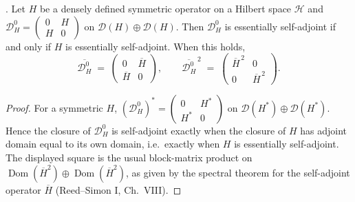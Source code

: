 \begin{lemma}
\label{v4-arith:w9-r4:lem:dirac-double-detects-sa}
\ClaimStatusProvedHere. Let \(H\) be a densely defined symmetric
operator on a Hilbert space \(\mathcal{H}\) and
\(\mathscr{D}_{H}^{0}=
\left(\begin{smallmatrix}0&H\\H&0\end{smallmatrix}\right)\)
on \(\mathcal{D}(H)\oplus\mathcal{D}(H)\). Then
\(\mathscr{D}_{H}^{0}\) is essentially self-adjoint if and only if
\(H\) is essentially self-adjoint. When this holds,
\[
\overline{\mathscr{D}_{H}^{0}}
\;=\;
\begin{pmatrix}
0 & \overline{H}\\
\overline{H} & 0
\end{pmatrix},
\qquad
\overline{\mathscr{D}_{H}^{0}}^{\,2}
\;=\;
\begin{pmatrix}
\overline{H}^{\,2} & 0\\
0 & \overline{H}^{\,2}
\end{pmatrix}.
\]
\end{lemma}

\begin{proof}
For a symmetric \(H\),
\((\mathscr{D}_{H}^{0})^{*}=
\left(\begin{smallmatrix}0&H^{*}\\H^{*}&0\end{smallmatrix}\right)\) on
\(\mathcal{D}(H^{*})\oplus\mathcal{D}(H^{*})\). Hence the closure of
\(\mathscr{D}_{H}^{0}\) is self-adjoint exactly when the closure of
\(H\) has adjoint domain equal to its own domain, i.e.\ exactly when
\(H\) is essentially self-adjoint. The displayed square is the usual
block-matrix product on
$\operatorname{Dom}(\overline H^2)\oplus\operatorname{Dom}(\overline H^2)$,
as given by the spectral theorem for the self-adjoint operator
\(\overline{H}\) (Reed--Simon I, Ch.~VIII).
\end{proof}

